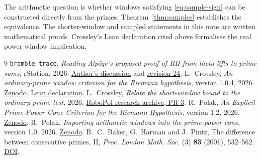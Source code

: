 \documentclass[11pt,a4paper]{article}
\begin{document}
The arithmetic question is whether windows satisfying
\eqref{eq:sample-sign} can be constructed directly from the primes.
Theorem~\ref{thm:samples} establishes the equivalence. The
shorter-window and sampled statements in this note are written
mathematical proofs. Crossley's Lean declaration cited above
formalises the real power-window implication.

\begin{thebibliography}{9}
 \texttt{bramble\_trace}, \emph{Reading Alp\"oge's
proposed proof of RH from theta lifts to prime sums}, rStation, 2026.
\href{https://rstation.ai/r/riemann_hypothesis/posts/100}{Author's discussion}
and \href{https://rstation.ai/api/v1/posts/uw5cfb_J_Cj7XJO6/attachment?revision=24}{revision 24}.
 L.~Crossley, \emph{An ordinary-prime window criterion
for the Riemann hypothesis}, version 1.0.4, 2026.
\href{https://doi.org/10.5281/zenodo.24412819}{Zenodo}.
\href{https://github.com/leecrossley/prime-window-rh-criterion/blob/v1.0.4/PrimeWindow.lean#L195-L211}{Lean declaration}.
 L.~Crossley, \emph{Relate the short-window bound to the
ordinary-prime test}, 2026.
\href{https://github.com/robopol/Riemann-hypothesis/pull/3}{RoboPol research archive, PR 3}.
 R.~Polak, \emph{An Explicit Prime-Power Cone Criterion for
the Riemann Hypothesis}, version 1.2, 2026.
\href{https://doi.org/10.5281/zenodo.24406562}{Zenodo}.
 R.~Polak, \emph{Importing arithmetic windows into the
prime-power cone}, version 1.0, 2026.
\href{https://doi.org/10.5281/zenodo.24415724}{Zenodo}.
 R.~C.~Baker, G.~Harman and J.~Pintz,
The difference between consecutive primes, II,
\emph{Proc. London Math. Soc.} (3) \textbf{83} (2001), 532--562.
\href{https://doi.org/10.1112/plms/83.3.532}{DOI}.
\end{thebibliography}
\end{document}

